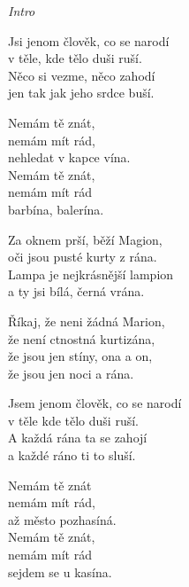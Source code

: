 
\re{}
\textit{Intro}
\vspace*{-5pt}

\ve{}
Jsi jenom člověk, co se narodí\\
v těle, kde tělo duši ruší.\\
Něco si vezme, něco zahodí\\
jen tak jak jeho srdce buší.

\re{}
Nemám tě znát,\\
nemám mít rád,\\
nehledat v kapce vína.\\
Nemám tě znát,\\
nemám mít rád\\
barbína, balerína. 

\ve{}
Za oknem prší, běží Magion,\\
oči jsou pusté kurty z rána.\\
Lampa je nejkrásnější lampion\\
a ty jsi bílá, černá vrána.

\cho{}
Říkaj, že neni žádná Marion,\\
že není ctnostná kurtizána,\\
že jsou jen stíny, ona a on,\\
že jsou jen noci a rána.

\ve{}
Jsem jenom člověk, co se narodí\\
v těle kde tělo duši ruší.\\
A každá rána ta se zahojí\\
a každé ráno ti to sluší.

\vspace*{-5pt}
\re{}
Nemám tě znát\\
nemám mít rád,\\
až město pozhasíná.\\
Nemám tě znát,\\
nemám mít rád\\
sejdem se u kasína. 

\cho{}

\esong{}